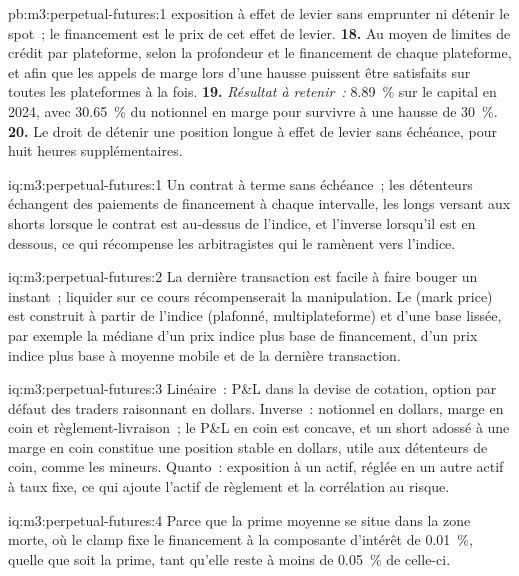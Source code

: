 \begin{solution}{pb:m3:perpetual-futures:1}
exposition à effet de levier sans emprunter ni détenir le spot~; le financement est le prix de cet effet de levier. \textbf{18.} Au moyen de limites de crédit par plateforme,
selon la profondeur et le financement de chaque plateforme, et afin que les appels de marge lors d'une hausse puissent être satisfaits sur toutes les plateformes à la fois.
\textbf{19.} \emph{Résultat à retenir~:} 8.89~\% sur le capital en 2024, avec 30.65~\% du notionnel en marge pour survivre à une
hausse de 30~\%. \textbf{20.} Le droit de détenir une position longue à effet de levier sans échéance, pour huit heures supplémentaires.
\end{solution}

\begin{solution}{iq:m3:perpetual-futures:1}
Un contrat à terme sans échéance~; les détenteurs échangent des paiements de financement à chaque intervalle, les longs versant aux shorts lorsque le contrat est
au-dessus de l'indice, et l'inverse lorsqu'il est en dessous, ce qui récompense les arbitragistes qui le ramènent vers l'indice.
\end{solution}

\begin{solution}{iq:m3:perpetual-futures:2}
La dernière transaction est facile à faire bouger un instant~; liquider sur ce cours récompenserait la manipulation. Le  (mark price) est construit à partir
de l'indice (plafonné, multiplateforme) et d'une base lissée, par exemple la médiane d'un prix indice plus base de financement,
d'un prix indice plus base à moyenne mobile et de la dernière transaction.
\end{solution}

\begin{solution}{iq:m3:perpetual-futures:3}
Linéaire~: P\&L dans la devise de cotation, option par défaut des traders raisonnant en dollars. Inverse~: notionnel en dollars, marge en coin et
règlement-livraison~; le P\&L en coin est concave, et un short adossé à une marge en coin constitue une position stable en dollars, utile aux
détenteurs de coin, comme les mineurs. Quanto~: exposition à un actif, réglée en un autre actif à taux fixe, ce qui ajoute l'actif de règlement
et la corrélation au risque.
\end{solution}

\begin{solution}{iq:m3:perpetual-futures:4}
Parce que la prime moyenne se situe dans la zone morte, où le clamp fixe le financement à la composante d'intérêt de
0.01~\%, quelle que soit la prime, tant qu'elle reste à moins de 0.05~\% de celle-ci.
\end{solution}

